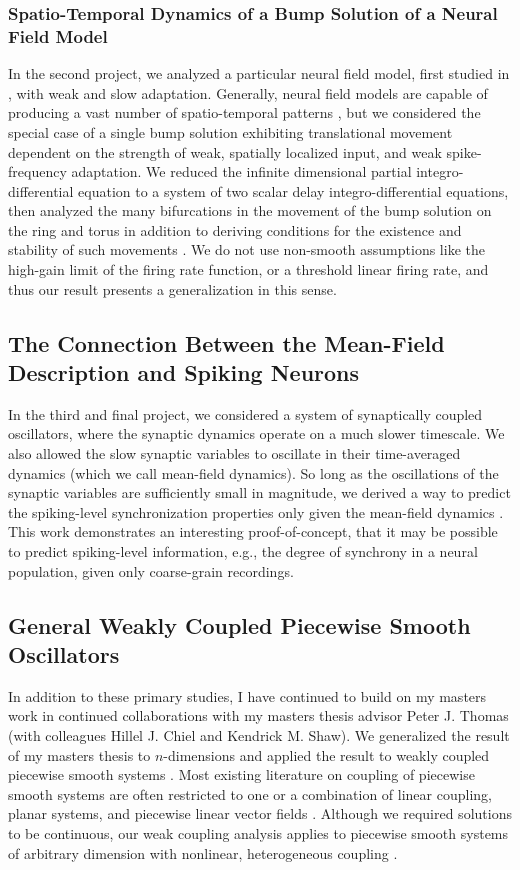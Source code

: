 \documentclass[a4paper,11pt]{article}
\begin{document}
\subsubsection{Spatio-Temporal Dynamics of a Bump Solution of a Neural Field Model}
In the second project, we analyzed a particular neural field model, first studied in \cite{pinto_ermentrout_2001_siam}, with weak and slow adaptation. Generally, neural field models are capable of producing a vast number of spatio-temporal patterns \cite{breakspear2017dynamic}, but we considered the special case of a single bump solution exhibiting translational movement dependent on the strength of weak, spatially localized input, and weak spike-frequency adaptation. We reduced the infinite dimensional partial integro-differential equation to a system of two scalar delay integro-differential equations, then analyzed the many bifurcations in the movement of the bump solution on the ring and torus in addition to deriving conditions for the existence and stability of such movements \cite{park2018scalar}. We do not use non-smooth assumptions like the high-gain limit of the firing rate function, or a threshold linear firing rate, and thus our result presents a generalization in this sense.

\subsection{The Connection Between the Mean-Field Description and Spiking Neurons}
In the third and final project, we considered a system of synaptically coupled oscillators, where the synaptic dynamics operate on a much slower timescale. We also allowed the slow synaptic variables to oscillate in their time-averaged dynamics (which we call mean-field dynamics). So long as the oscillations of the synaptic variables are sufficiently small in magnitude, we derived a way to predict the spiking-level synchronization properties only given the mean-field dynamics \cite{park2018multiple}. This work demonstrates an interesting proof-of-concept, that it may be possible to predict spiking-level information, e.g., the degree of synchrony in a neural population, given only coarse-grain recordings.

\subsection{General Weakly Coupled Piecewise Smooth Oscillators}
In addition to these primary studies, I have continued to build on my masters work in continued collaborations with my masters thesis advisor Peter J. Thomas (with colleagues Hillel J. Chiel and Kendrick M. Shaw). We generalized the result of my masters thesis to $n$-dimensions and applied the result to weakly coupled piecewise smooth systems \cite{park2016infinitesimal}. Most existing literature on coupling of piecewise smooth systems are often restricted to one or a combination of linear coupling, planar systems, and piecewise linear vector fields \cite{coombes2016synchrony,izhikevich2000phase,coombes2012nonsmooth}. Although we required solutions to be continuous, our weak coupling analysis applies to piecewise smooth systems of arbitrary dimension with nonlinear, heterogeneous coupling \cite{park2018infinitesimal}.
\end{document}
